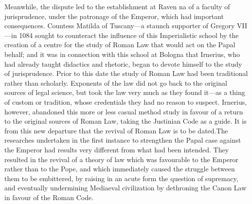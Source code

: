 \documentclass{book}
\begin{document}
Meanwhile, the dispute led to the establishment at Raven na of a faculty of jurisprudence, under the patronage of the Emperor, which had important consequences. Countess Matilda of Tuscany—a staunch supporter of Gregory VII—in 1084 sought to counteract the influence of this Imperialistic school by the creation of a centre for the study of Roman Law that would act on the Papal behalf; and it was in connection with this school at Bologna that Irnerius, who had already taught didactics and rhetoric, began to devote himself to the study of jurisprudence. Prior to this date the study of Roman Law had been traditional rather than scholarly. Exponents of the law did not go back to the original sources of legal science, but took the law very much as they found it—as a thing of custom or tradition, whose credentials they had no reason to suspect. Irnerius, however, abandoned this more or less casual method study in favour of a return to the original sources of Roman Law, taking the Justinian Code as a guide. It is from this new departure that the revival of Roman Law is to be dated.\footnotemark[2] The researches undertaken in the first instance to strengthen the Papal case against the Emperor had results very different from what had been intended. They resulted in the revival of a theory of law which was favourable to the Emperor rather than to the Pope, and which immediately caused the struggle between them to be embittered, by raising in an acute form the question of supremacy, and eventually undermining Mediaeval civilization by dethroning the Canon Law in favour of the Roman Code.
\end{document}
